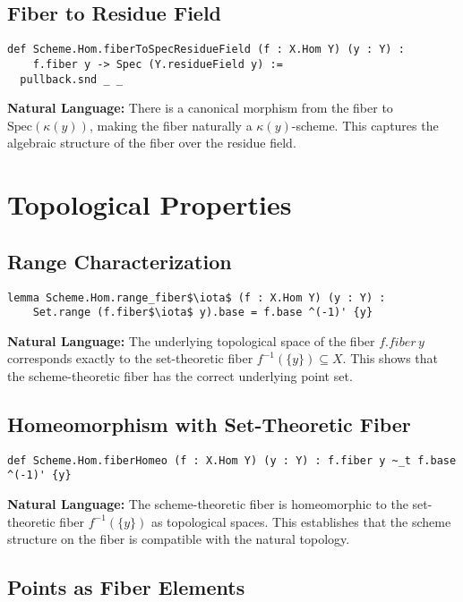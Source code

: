 \documentclass{article}
\theoremstyle{definition}
\begin{document}
\subsection{Fiber to Residue Field}

\begin{lstlisting}
def Scheme.Hom.fiberToSpecResidueField (f : X.Hom Y) (y : Y) :
    f.fiber y -> Spec (Y.residueField y) :=
  pullback.snd _ _
\end{lstlisting}

\textbf{Natural Language:} There is a canonical morphism from the fiber to $\mathrm{Spec}(\kappa(y))$, making the fiber naturally a $\kappa(y)$-scheme. This captures the algebraic structure of the fiber over the residue field.

\section{Topological Properties}

\subsection{Range Characterization}

\begin{lstlisting}
lemma Scheme.Hom.range_fiber$\iota$ (f : X.Hom Y) (y : Y) :
    Set.range (f.fiber$\iota$ y).base = f.base ^(-1)' {y}
\end{lstlisting}

\textbf{Natural Language:} The underlying topological space of the fiber $f.fiber\, y$ corresponds exactly to the set-theoretic fiber $f^{-1}(\{y\}) \subseteq X$. This shows that the scheme-theoretic fiber has the correct underlying point set.

\subsection{Homeomorphism with Set-Theoretic Fiber}

\begin{lstlisting}
def Scheme.Hom.fiberHomeo (f : X.Hom Y) (y : Y) : f.fiber y ~_t f.base ^(-1)' {y}
\end{lstlisting}

\textbf{Natural Language:} The scheme-theoretic fiber is homeomorphic to the set-theoretic fiber $f^{-1}(\{y\})$ as topological spaces. This establishes that the scheme structure on the fiber is compatible with the natural topology.

\subsection{Points as Fiber Elements}
\end{document}
